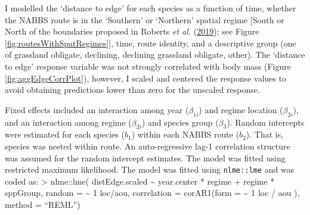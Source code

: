 \documentclass[12pt,twoside,openany]{reedthesis}
\begin{document}
I modelled the `distance to edge' for each species as a function of time, whether the NABBS route is in the `Southern' or `Northern' spatial regime {[}South or North of the boundaries proposed in Roberts \emph{et al.} (\protect\hyperlink{ref-roberts2019shifting}{2019}); see Figure \ref{fig:routesWithSpatRegimes}{]}, time, route identity, and a descriptive group (one of grassland obligate, declining, declining grassland obligate, other). The `distance to edge' response variable was not strongly correlated with body mass (Figure \ref{fig:aggEdgeCorrPlot}), however, I scaled and centered the response values to avoid obtaining predictions lower than zero for the unscaled response.

Fixed effects included an interaction among year (\(\beta_{1i}\)) and regime location (\(\beta_{2i}\)), and an interaction among regime (\(\beta_{2i}\)) and species group (\(\beta_{3}\)). Random intercepts were estimated for each species (\(b_1\)) within each NABBS route (\(b_2\)). That is, species was nested within route. An auto-regressive lag-1 correlation structure was assumed for the random intercept estimates. The model was fitted using restricted maximum likelihood. The model was fitted using \texttt{nlme::lme} and was coded as:
\textgreater{} nlme::lme( distEdge.scaled \textasciitilde{} year.center * regime + regime * sppGroup,
random = \textasciitilde{} 1 \textbar{} loc/aou, correlation = corAR1(form = \textasciitilde{} 1 \textbar{} loc / aou ), method = ``REML'')
\end{document}
